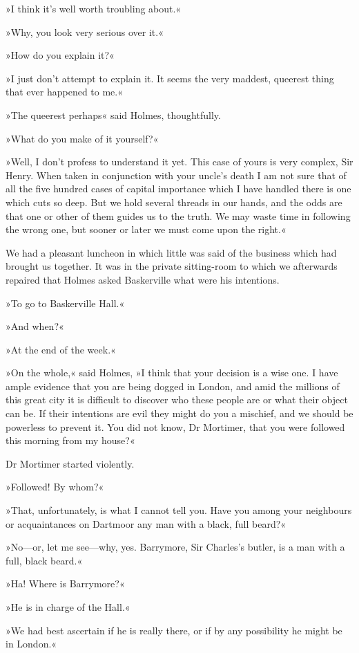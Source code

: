 »I think it's well worth troubling about.«

»Why, you look very serious over it.«

»How do you explain it?«

»I just don't attempt to explain it. It seems the very maddest, queerest thing that ever happened to me.«

»The queerest perhaps\longdash« said Holmes, thoughtfully.

»What do you make of it yourself?«

»Well, I don't profess to understand it yet. This case of yours is very complex, Sir Henry. When taken in conjunction with your uncle's death I am not sure that of all the five hundred cases of capital importance which I have handled there is one which cuts so deep. But we hold several threads in our hands, and the odds are that one or other of them guides us to the truth. We may waste time in following the wrong one, but sooner or later we must come upon the right.«

We had a pleasant luncheon in which little was said of the business which had brought us together. It was in the private sitting-room to which we afterwards repaired that Holmes asked Baskerville what were his intentions.

»To go to Baskerville Hall.«

»And when?«

»At the end of the week.«

»On the whole,« said Holmes, »I think that your decision is a wise one. I have ample evidence that you are being dogged in London, and amid the millions of this great city it is difficult to discover who these people are or what their object can be. If their intentions are evil they might do you a mischief, and we should be powerless to prevent it. You did not know, Dr Mortimer, that you were followed this morning from my house?«

Dr Mortimer started violently.

»Followed! By whom?«

»That, unfortunately, is what I cannot tell you. Have you among your neighbours or acquaintances on Dartmoor any man with a black, full beard?«

»No—or, let me see—why, yes. Barrymore, Sir Charles's butler, is a man with a full, black beard.«

»Ha! Where is Barrymore?«

»He is in charge of the Hall.«

»We had best ascertain if he is really there, or if by any possibility he might be in London.«

